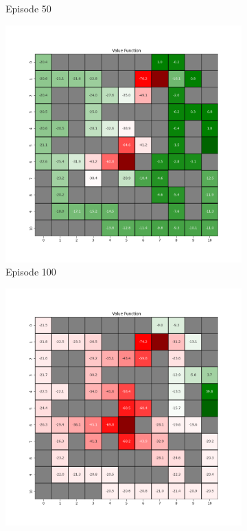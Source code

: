 \documentclass{assignment}
\begin{document}
\begin{figure}[H]
\begin{subfigure}{0.3\textwidth}
    \caption{Episode 50}
    \end{subfigure}\hfill
    \begin{subfigure}{0.3\textwidth}
        \includegraphics[width=\textwidth]{figures/value_td/epsilon_sweep/value_function_alpha_0.1_gamma_0.95_epsilon_1.0_iteration_100.png}
    \caption{Episode 100}
    \end{subfigure}
    \begin{subfigure}{0.3\textwidth}
        \includegraphics[width=\textwidth]{figures/value_td/epsilon_sweep/value_function_alpha_0.1_gamma_0.95_epsilon_1.0_iteration_1000.png}

\end{subfigure}
\end{figure}
\end{document}
